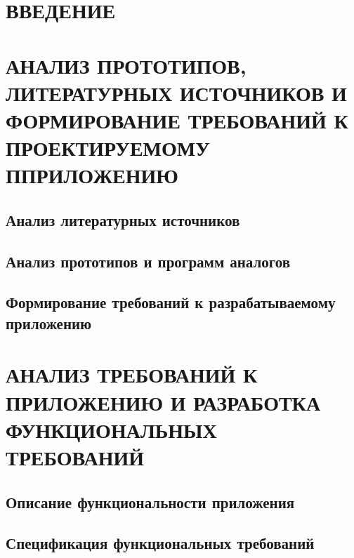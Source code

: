 \documentclass[a4paper,14pt]{extreport}
\begin{document}



\newpage
\renewcommand\contentsname{\normalsize СОДЕРЖАНИЕ}
\tableofcontents 

\parindent=1.25cm
\newpage

\section*{\normalsize ВВЕДЕНИЕ}

\label{sec:intro}


\newpage
\section{\normalsize АНАЛИЗ ПРОТОТИПОВ, ЛИТЕРАТУРНЫХ ИСТОЧНИКОВ И ФОРМИРОВАНИЕ ТРЕБОВАНИЙ К ПРОЕКТИРУЕМОМУ ППРИЛОЖЕНИЮ}
\label{sec:exp}


\subsection{\normalsize Анализ литературных источников}
\label{sec:exp:analog}


\subsection{\normalsize Анализ прототипов и программ аналогов}
\label{sec:exp:analog}


\subsection{\normalsize Формирование требований к разрабатываемому приложению}
\label{sec:exp:analog}


\newpage
\section{\normalsize АНАЛИЗ ТРЕБОВАНИЙ К ПРИЛОЖЕНИЮ И РАЗРАБОТКА ФУНКЦИОНАЛЬНЫХ ТРЕБОВАНИЙ}

\subsection{\normalsize Описание функциональности приложения}
\label{sec:exp:analog}


\subsection{\normalsize Спецификация  функциональных требований}
\label{sec:exp:analog}

\end{document}
